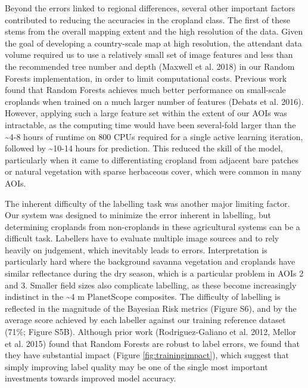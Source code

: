 \documentclass[11pt,a4paper]{article}
\begin{document}
Beyond the errors linked to regional differences, several other
important factors contributed to reducing the accuracies in the cropland
class. The first of these stems from the overall mapping extent and the
high resolution of the data. Given the goal of developing a
country-scale map at high resolution, the attendant data volume required
us to use a relatively small set of image features and less than the
recommended tree number and depth (Maxwell et al. 2018) in our Random
Forests implementation, in order to limit computational costs. Previous
work found that Random Forests achieves much better performance on
small-scale croplands when trained on a much larger number of features
(Debats et al. 2016). However, applying such a large feature set within
the extent of our AOIs was intractable, as the computing time would have
been several-fold larger than the \textasciitilde4-8 hours of runtime on
800 CPUs required for a single active learning iteration, followed by
\textasciitilde10-14 hours for prediction. This reduced the skill of the
model, particularly when it came to differentiating cropland from
adjacent bare patches or natural vegetation with sparse herbaceous
cover, which were common in many AOIs.

The inherent difficulty of the labelling task was another major limiting
factor. Our system was designed to minimize the error inherent in
labelling, but determining croplands from non-croplands in these
agricultural systems can be a difficult task. Labellers have to evaluate
multiple image sources and to rely heavily on judgement, which
inevitably leads to errors. Interpretation is particularly hard where
the background savanna vegetation and croplands have similar reflectance
during the dry season, which is a particular problem in AOIs 2 and 3.
Smaller field sizes also complicate labelling, as these become
increasingly indistinct in the \textasciitilde4 m PlanetScope
composites. The difficulty of labelling is reflected in the magnitude of
the Bayesian Risk metrics (Figure S6), and by the average score achieved
by each labeller against our training reference dataset (71\%; Figure
S5B). Although prior work (Rodriguez-Galiano et al. 2012, Mellor et al.
2015) found that Random Forests are robust to label errors, we found
that they have substantial impact (Figure \ref{fig:trainingimpact}),
which suggest that simply improving label quality may be one of the
single most important investments towards improved model accuracy.
\end{document}
